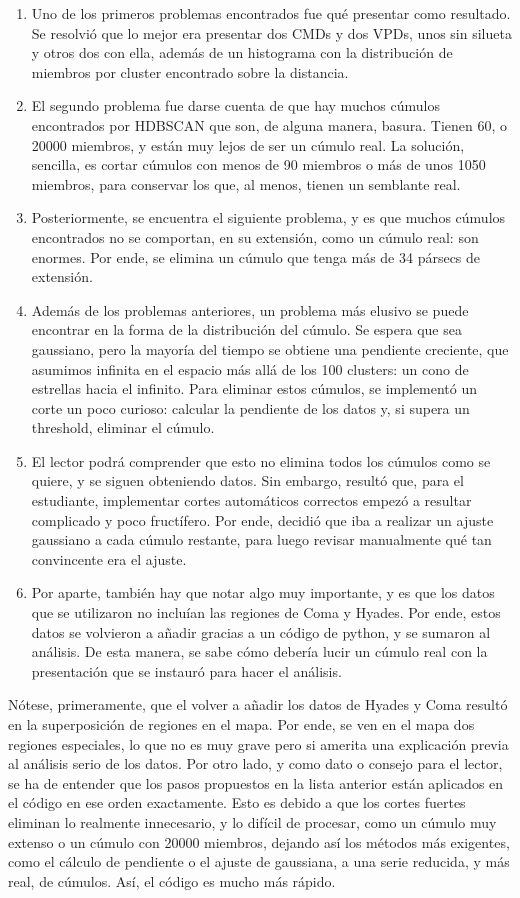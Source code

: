 \documentclass[10pt,twocolumn]{article}
\begin{document}
\begin{enumerate}
  \item  Uno de los primeros problemas encontrados fue qué presentar como resultado. 
  Se resolvió que lo mejor era presentar dos CMDs y dos VPDs, unos sin silueta y otros dos con ella, 
  además de un histograma con la distribución de miembros por cluster encontrado sobre la distancia. 
  \item El segundo problema fue darse cuenta de que hay muchos cúmulos encontrados por HDBSCAN que son, 
  de alguna manera, basura. Tienen 60, o 20000 miembros, y están muy lejos de ser un cúmulo real. 
  La solución, sencilla, es cortar cúmulos con menos de 90 miembros o más de unos 1050 miembros, 
  para conservar los que, al menos, tienen un semblante real. 
  \item Posteriormente, se encuentra el siguiente problema, y es que muchos cúmulos encontrados
  no se comportan, en su extensión, como un cúmulo real: son enormes. Por ende, se elimina un cúmulo
  que tenga más de 34 pársecs de extensión. 
  \item Además de los problemas anteriores, un problema más elusivo se puede encontrar en la forma de la distribución 
  del cúmulo. Se espera que sea gaussiano, pero la mayoría del tiempo se obtiene una pendiente creciente, que asumimos
  infinita en el espacio más allá de los 100 clusters: un cono de estrellas hacia el infinito. Para eliminar estos cúmulos, 
  se implementó un corte un poco curioso: calcular la pendiente de los datos y, si supera un threshold, eliminar el cúmulo. 
  \item El lector podrá comprender que esto no elimina todos los cúmulos como se quiere, y se siguen obteniendo datos. 
  Sin embargo, resultó que, para el estudiante, implementar cortes automáticos correctos empezó a resultar complicado
  y poco fructífero. Por ende, decidió que iba a realizar un ajuste gaussiano a cada cúmulo restante, para luego revisar 
  manualmente qué tan convincente era el ajuste. 
  \item Por aparte, también hay que notar algo muy importante, y es que los datos que se utilizaron no incluían las regiones
  de Coma y Hyades. Por ende, estos datos se volvieron a añadir gracias a un código de python, y se sumaron al análisis. 
  De esta manera, se sabe cómo debería lucir un cúmulo real con la presentación que se instauró para hacer el análisis. 
\end{enumerate}

Nótese, primeramente, que el volver a añadir los datos de Hyades y Coma resultó en la superposición de regiones en el mapa.
Por ende, se ven en el mapa dos regiones especiales, lo que no es muy grave pero si amerita una explicación previa al análisis
serio de los datos. 
Por otro lado, y como dato o consejo para el lector, se ha de entender que los pasos propuestos en la lista anterior están aplicados 
en el código en ese orden exactamente. Esto es debido a que los cortes fuertes eliminan lo realmente innecesario, y lo difícil de procesar, 
como un cúmulo muy extenso o un cúmulo con 20000 miembros, dejando así los métodos más exigentes, como el cálculo de pendiente o el 
ajuste de gaussiana, a una serie reducida, y más real, de cúmulos. Así, el código es mucho más rápido. 
\end{document}
